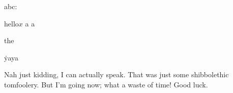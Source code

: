\font

abc^^z %

hello$x$ %
a%
a   %
\hi

the


\. yaya %
\  %

Nah just kidding, I can actually speak. That was just some shibbolethic tomfoolery. But I'm going now; what a waste of time! Good luck.
